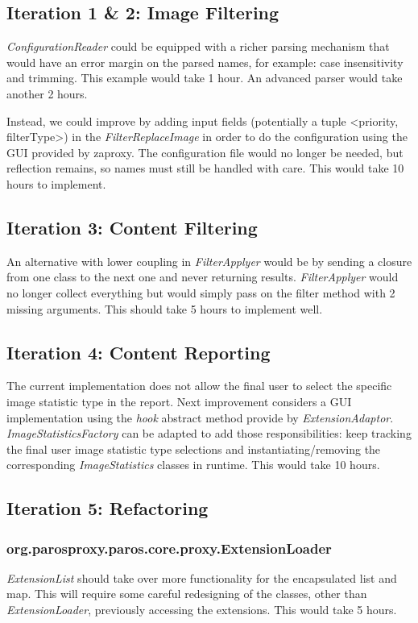 \subsection{Iteration 1 \& 2: Image Filtering}


\textit{ConfigurationReader} could be equipped with a richer parsing mechanism that would have an error margin on the parsed names, for example: case insensitivity and trimming. This example would take 1 hour. An advanced parser would take another 2 hours.
\par
Instead, we could improve by adding input fields (potentially a tuple <priority, filterType>) in the \textit{FilterReplaceImage} in order to do the configuration using the GUI provided by zaproxy. The configuration file would no longer be needed, but reflection remains, so names must still be handled with care. This would take 10 hours to implement.
\subsection{Iteration 3: Content Filtering}
An alternative with lower coupling in \textit{FilterApplyer} would be by sending a closure from one class to the next one and never returning results. \textit{FilterApplyer} would no longer collect everything but would simply pass on the filter method with 2 missing arguments. This should take 5 hours to implement well.
\subsection{Iteration 4: Content Reporting}
The current implementation does not allow the final user to select the specific image statistic type in the report. Next improvement considers a GUI implementation using the \textit{hook} abstract method provide by \textit{ExtensionAdaptor}. \textit{ImageStatisticsFactory} can be adapted to add those responsibilities: keep tracking the final user image statistic type selections and instantiating/removing the corresponding \textit{ImageStatistics} classes in runtime. This would take 10 hours.

\subsection{Iteration 5: Refactoring}
\subsubsection{org.parosproxy.paros.core.proxy.ExtensionLoader}
\textit{ExtensionList} should take over more functionality for the encapsulated list and map. This will require some careful redesigning of the classes, other than \textit{ExtensionLoader}, previously accessing the extensions. This would take 5 hours.
